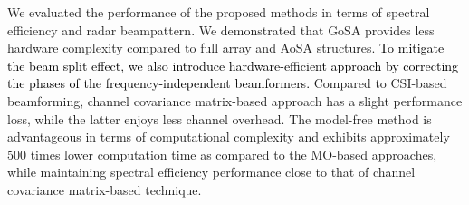 \documentclass[journal,10pt]{IEEEtran}
\begin{document}
	We evaluated the performance of the proposed methods in terms of spectral efficiency and radar beampattern. We demonstrated that GoSA provides less hardware complexity compared to full array and AoSA structures. \textcolor{black}{To mitigate the beam split effect, we also introduce hardware-efficient approach by correcting the phases of the frequency-independent beamformers.} Compared to CSI-based beamforming, channel covariance matrix-based approach has a slight performance loss, while the latter enjoys less channel overhead. The model-free method is advantageous in terms of computational complexity and exhibits approximately $500$ times lower computation time as compared to the MO-based approaches, while maintaining  spectral efficiency performance close to that of channel covariance matrix-based technique.
	
	
	
	\appendices
	
\end{document}
